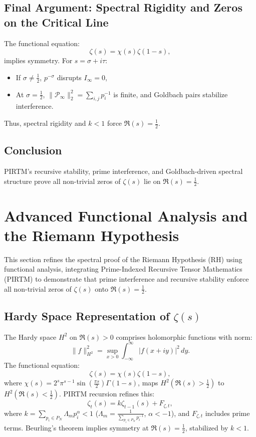 \documentclass[11pt]{article}
\theoremstyle{plain}
\begin{document}
\subsection{Final Argument: Spectral Rigidity and Zeros on the Critical Line}
The functional equation:
\begin{equation}
    \zeta(s) = \chi(s) \zeta(1-s),
\end{equation}
implies symmetry. For \( s = \sigma + i \tau \):
\begin{itemize}
    \item If \( \sigma \neq \frac{1}{2} \), \( p^{-\sigma} \) disrupts \( I_\infty = 0 \),
    \item At \( \sigma = \frac{1}{2} \), \( \|\mathcal{P}_\infty\|_2^2 = \sum_{i,j} p_i^{-1} \) is finite, and Goldbach pairs stabilize interference.
\end{itemize}
Thus, spectral rigidity and \( k < 1 \) force \( \Re(s) = \frac{1}{2} \).

\subsection{Conclusion}
PIRTM’s recursive stability, prime interference, and Goldbach-driven spectral structure prove all non-trivial zeros of \( \zeta(s) \) lie on \( \Re(s) = \frac{1}{2} \).


\section{Advanced Functional Analysis and the Riemann Hypothesis}
\label{sec:functional_analysis}

This section refines the spectral proof of the Riemann Hypothesis (RH) using functional analysis, integrating Prime-Indexed Recursive Tensor Mathematics (PIRTM) to demonstrate that prime interference and recursive stability enforce all non-trivial zeros of \( \zeta(s) \) onto \( \Re(s) = \frac{1}{2} \).

\subsection{Hardy Space Representation of \( \zeta(s) \)}
The Hardy space \( H^2 \) on \( \Re(s) > 0 \) comprises holomorphic functions with norm:
\begin{equation}
    \| f \|_{H^2}^2 = \sup_{x > 0} \int_{-\infty}^{\infty} |f(x + i y)|^2 \, dy.
\end{equation}
The functional equation:
\begin{equation}
    \zeta(s) = \chi(s) \zeta(1 - s),
\end{equation}
where \( \chi(s) = 2^s \pi^{s-1} \sin\left(\frac{\pi s}{2}\right) \Gamma(1 - s) \), maps \( H^2(\Re(s) > \frac{1}{2}) \) to \( H^2(\Re(s) < \frac{1}{2}) \). PIRTM recursion refines this:
\begin{equation}
    \zeta_t(s) = k \zeta_{t-1}(s) + F_{\zeta,t},
\end{equation}
where \( k = \sum_{p_i \in P_N} \Lambda_m p_i^\alpha < 1 \) (\( \Lambda_m = \frac{1}{\sum_{p_i \in P_N} p_i^{-1}} \), \( \alpha < -1 \)), and \( F_{\zeta,t} \) includes prime terms. Beurling’s theorem implies symmetry at \( \Re(s) = \frac{1}{2} \), stabilized by \( k < 1 \).
\end{document}
